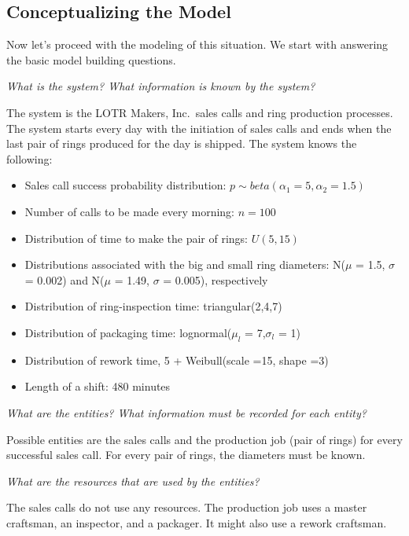 \documentclass[
]{book}
\theoremstyle{definition}
\theoremstyle{definition}
\theoremstyle{definition}
\theoremstyle{definition}
\theoremstyle{remark}
\begin{document}
\hypertarget{conceptualizing-the-model}{%
\subsection{Conceptualizing the Model}\label{conceptualizing-the-model}}

Now let's proceed with the modeling of this situation. We start with answering the basic model
building questions.

\emph{What is the system? What information is known by the system?}

The system is the LOTR Makers, Inc.~sales calls and ring production
processes. The system starts every day with the initiation of sales
calls and ends when the last pair of rings produced for the day is
shipped. The system knows the following:

\begin{itemize}
\item
  Sales call success probability distribution:
  \(p \sim beta(\alpha_1 = 5,\alpha_2 = 1.5)\)
\item
  Number of calls to be made every morning: \(n = 100\)
\item
  Distribution of time to make the pair of rings: \(U(5,15)\)
\item
  Distributions associated with the big and small ring diameters:
  N(\(\mu\) = 1.5, \(\sigma\) = 0.002) and N(\(\mu\) = 1.49, \(\sigma\) =
  0.005), respectively
\item
  Distribution of ring-inspection time: triangular(2,4,7)
\item
  Distribution of packaging time: lognormal(\(\mu_{l}\) = 7,\(\sigma_{l}\)
  = 1)
\item
  Distribution of rework time, 5 + Weibull(scale =15, shape =3)
\item
  Length of a shift: 480 minutes
\end{itemize}

\emph{What are the entities? What information must be recorded for each entity?}

Possible entities are the sales calls and the production job (pair of
rings) for every successful sales call. For every pair of rings, the
diameters must be known.

\emph{What are the resources that are used by the entities?}

The sales calls do not use any resources. The production job uses a
master craftsman, an inspector, and a packager. It might also use a
rework craftsman.
\end{document}
